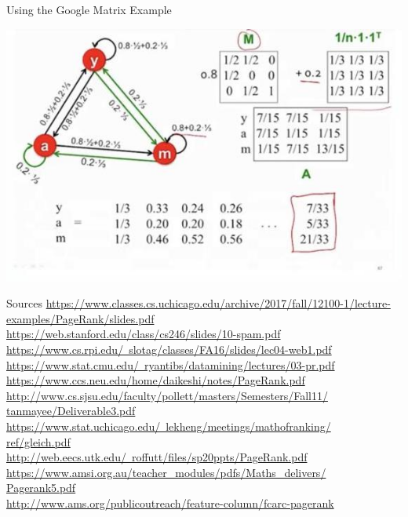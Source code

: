 \documentclass{beamer}
\begin{document}
\begin{frame}{Using the Google Matrix Example}
    \begin{center}
        \includegraphics[width=\textwidth]{example.jpg}   
    \end{center}
\end{frame}

\begin{frame}[t]{Sources}
    \small
    \href{https://www.classes.cs.uchicago.edu/archive/2017/fall/12100-1/lecture-examples/PageRank/slides.pdf}{https://www.classes.cs.uchicago.edu/archive/2017/fall/12100-1/lecture-examples/PageRank/slides.pdf}\\
    \href{https://web.stanford.edu/class/cs246/slides/10-spam.pdf}{https://web.stanford.edu/class/cs246/slides/10-spam.pdf}\\
    \href{https://www.cs.rpi.edu/~slotag/classes/FA16/slides/lec04-web1.pdf}{https://www.cs.rpi.edu/~slotag/classes/FA16/slides/lec04-web1.pdf}\\
    \href{https://www.stat.cmu.edu/~ryantibs/datamining/lectures/03-pr.pdf}{https://www.stat.cmu.edu/~ryantibs/datamining/lectures/03-pr.pdf}\\
    \href{https://www.ccs.neu.edu/home/daikeshi/notes/PageRank.pdf}{https://www.ccs.neu.edu/home/daikeshi/notes/PageRank.pdf}\\
    \href{http://www.cs.sjsu.edu/faculty/pollett/masters/Semesters/Fall11/tanmayee/Deliverable3.pdf}{http://www.cs.sjsu.edu/faculty/pollett/masters/Semesters/Fall11/\\tanmayee/Deliverable3.pdf}\\
    \href{https://www.stat.uchicago.edu/~lekheng/meetings/mathofranking/ref/gleich.pdf}{https://www.stat.uchicago.edu/~lekheng/meetings/mathofranking/\\ref/gleich.pdf} \\
    \href{http://web.eecs.utk.edu/~roffutt/files/sp20ppts/PageRank.pdf}{http://web.eecs.utk.edu/~roffutt/files/sp20ppts/PageRank.pdf}\\
    \href{https://www.amsi.org.au/teacher_modules/pdfs/Maths_delivers/Pagerank5.pdf}{https://www.amsi.org.au/teacher\_modules/pdfs/Maths\_delivers/\\Pagerank5.pdf}\\
    \href{http://www.ams.org/publicoutreach/feature-column/fcarc-pagerank}{http://www.ams.org/publicoutreach/feature-column/fcarc-pagerank}\\
\end{frame}
\end{document}

